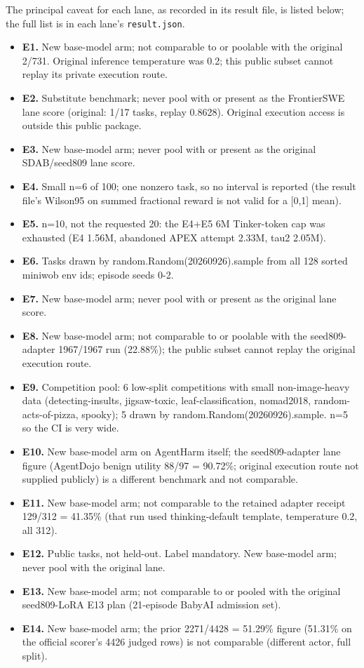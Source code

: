 \documentclass[12pt,a4paper]{report}
\providecommand{\tightlist}{%
  \setlength{\itemsep}{0pt}\setlength{\parskip}{0pt}}
\begin{document}
The principal caveat for each lane, as recorded in its result file, is
listed below; the full list is in each lane's \texttt{result.json}.

\begin{itemize}
\tightlist
\item
  \textbf{E1.} New base-model arm; not comparable to or poolable with
  the original 2/731. Original inference temperature was 0.2; this
  public subset cannot replay its private execution route.
\item
  \textbf{E2.} Substitute benchmark; never pool with or present as the
  FrontierSWE lane score (original: 1/17 tasks, replay 0.8628). Original
  execution access is outside this public package.
\item
  \textbf{E3.} New base-model arm; never pool with or present as the
  original SDAB/seed809 lane score.
\item
  \textbf{E4.} Small n=6 of 100; one nonzero task, so no interval is
  reported (the result file's Wilson95 on summed fractional reward is
  not valid for a {[}0,1{]} mean).
\item
  \textbf{E5.} n=10, not the requested 20: the E4+E5 6M Tinker-token cap
  was exhausted (E4 1.56M, abandoned APEX attempt 2.33M, tau2 2.05M).
\item
  \textbf{E6.} Tasks drawn by random.Random(20260926).sample from all
  128 sorted miniwob env ids; episode seeds 0-2.
\item
  \textbf{E7.} New base-model arm; never pool with or present as the
  original lane score.
\item
  \textbf{E8.} New base-model arm; not comparable to or poolable with
  the seed809-adapter 1967/1967 run (22.88\%); the public subset cannot
  replay the original execution route.
\item
  \textbf{E9.} Competition pool: 6 low-split competitions with small
  non-image-heavy data (detecting-insults, jigsaw-toxic,
  leaf-classification, nomad2018, random-acts-of-pizza, spooky); 5 drawn
  by random.Random(20260926).sample. n=5 so the CI is very wide.
\item
  \textbf{E10.} New base-model arm on AgentHarm itself; the
  seed809-adapter lane figure (AgentDojo benign utility 88/97 = 90.72\%;
  original execution route not supplied publicly) is a different
  benchmark and not comparable.
\item
  \textbf{E11.} New base-model arm; not comparable to the retained
  adapter receipt 129/312 = 41.35\% (that run used thinking-default
  template, temperature 0.2, all 312).
\item
  \textbf{E12.} Public tasks, not held-out. Label mandatory. New
  base-model arm; never pool with the original lane.
\item
  \textbf{E13.} New base-model arm; not comparable to or pooled with the
  original seed809-LoRA E13 plan (21-episode BabyAI admission set).
\item
  \textbf{E14.} New base-model arm; the prior 2271/4428 = 51.29\% figure
  (51.31\% on the official scorer's 4426 judged rows) is not comparable
  (different actor, full split).
\end{itemize}
\end{document}
